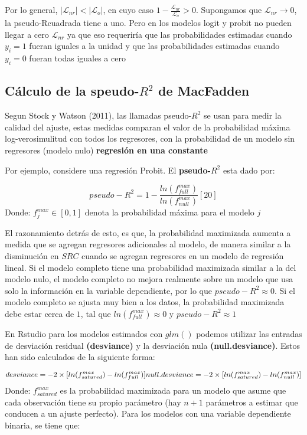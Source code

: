 \documentclass[
  letterpaper,
  DIV=11,
  numbers=noendperiod]{scrreprt}
\begin{document}
Por lo general, \(|\mathscr{L}_{nr}|<|\mathscr{L}_{o}|\), en cuyo caso
\(1-\frac{\mathscr{L}_{nr}}{\mathscr{L}_{o}}>0\). Supongamos que
\(\mathscr{L}_{nr}\rightarrow0\), la pseudo-Rcuadrada tiene a uno. Pero
en los modelos logit y probit no pueden llegar a cero
\(\mathscr{L}_{nr}\) ya que eso requeriría que las probabilidades
estimadas cuando \(y_i=1\) fueran iguales a la unidad y que las
probabilidades estimadas cuando \(y_i=0\) fueran todas iguales a cero

\subsection{\texorpdfstring{Cálculo de la speudo-\(R^2\) de
MacFadden}{Cálculo de la speudo-R\^{}2 de MacFadden}}\label{cuxe1lculo-de-la-speudo-r2-de-macfadden}

Segun Stock y Watson (2011), las llamadas pseudo-\(R^2\) se usan para
medir la calidad del ajuste, estas medidas comparan el valor de la
probabilidad máxima log-verosimulitud con todos los regresores, con la
probabilidad de un modelo sin regresores (modelo nulo) \textbf{regresión
en una constante}

Por ejemplo, considere una regresión Probit. El \textbf{pseudo-}\(R^2\)
esta dado por:

\[pseudo-R^2=1-\frac{ln(f^{max}_{full})}{ln(f^{max}_{null})} [20]\]
Donde: \(f^{max}_j\in[0,1]\) denota la probabilidad máxima para el
modelo \(j\)

El razonamiento detrás de esto, es que, la probabilidad maximizada
aumenta a medida que se agregan regresores adicionales al modelo, de
manera similar a la disminución en \(SRC\) cuando se agregan regresores
en un modelo de regresión lineal. Si el modelo completo tiene una
probabilidad maximizada similar a la del modelo nulo, el modelo completo
no mejora realmente sobre un modelo que usa solo la información en la
variable dependiente, por lo que \(pseudo-R^2\approx0\). Si el modelo
completo se ajusta muy bien a los datos, la probabilidad maximizada debe
estar cerca de \(1\), tal que \(ln(f^{max}_{full})\approx0\) y
\(pseudo-R^2\approx1\)

En Rstudio para los modelos estimados con \(glm()\) podemos utilizar las
entradas de desviación residual \textbf{(desviance)} y la desviación
nula \textbf{(null.desviance)}. Estos han sido calculados de la
siguiente forma:

\[desviance=-2\times[ln(f^{max}_{satured})-ln(f^{max}_{full})]\\null.desviance=-2\times[ln(f^{max}_{satured})-ln(f^{max}_{null})]\]
Donde: \(f^{max}_{satured}\) es la probabilidad maximizada para un
modelo que asume que cada observación tiene su propio parámetro (hay
\(n+1\) parámetros a estimar que conducen a un ajuste perfecto). Para
los modelos con una variable dependiente binaria, se tiene que:
\end{document}
